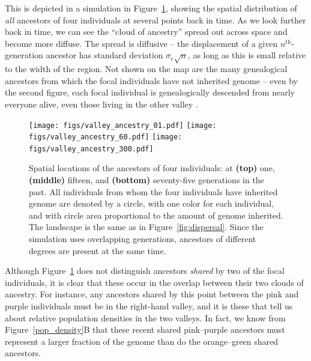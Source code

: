 \documentclass{ar-1col}
\newcommand{\g}[1]{{\color{blue}{#1}}}
\newcommand{\plr}[1]{{\color{green}{#1}}}
\newcommand{\todo}[1]{{\textbf{\color{red}{#1}}}}
\begin{document}
This is depicted in a simulation in Figure~\ref{ancestry_spread},
showing the spatial distribution of \emph{all} ancestors of four individuals
at several points back in time.
As we look further back in time,
we can see the ``cloud of ancestry'' spread out across space
and become more diffuse.
The spread is diffusive --
the displacement of a given $n^\text{th}$-generation ancestor 
has standard deviation $\sigma_e \sqrt{n}$,
as long as this is small relative to the width of the region.
Not shown on the map are the many genealogical ancestors
from which the focal individuals have not inherited genome --
even by the second figure,
each focal individual is genealogically descended from nearly everyone alive,
even those living in the other valley \citep{chang1999}.

\todo{tidy and conclude}

\begin{figure}[ht]
    \centering
        \texttt{[image: figs/valley\_ancestry\_01.pdf]}
        \texttt{[image: figs/valley\_ancestry\_60.pdf]}
        \texttt{[image: figs/valley\_ancestry\_300.pdf]}
        \caption{
            Spatial locations of the ancestors of four individuals:
            at 
            \textbf{(top)} one, 
            \textbf{(middle)} fifteen, and
            \textbf{(bottom)} seventy-five generations in the past.
            All individuals from whom the four individuals have inherited genome are denoted by a circle,
            with one color for each individual,
            and with circle area proportional to the amount of genome inherited.
            The landscape is the same as in Figure~\ref{fig:dispersal}.
            Since the simulation uses overlapping generations,
            ancestors of different degrees are present at the same time.
            \g{I say keep 1, 20, and 75.  If you go back farther, 
            	does it get even clearer that the pedigrees have ``forgotten" which side of the ridge the modern inds are on? 
                If so, that might make the point more clearly.}
            \plr{it does; I haven't run the simulation that long, though.}
        }
        \label{ancestry_spread}
\end{figure}

Although Figure~\ref{ancestry_spread} does not distinguish ancestors \emph{shared} by two of the focal individuals,
it is clear that these occur in the overlap between their two clouds of ancestry.
For instance, any ancestors shared by this point between the pink and purple individuals
must be in the right-hand valley,
and it is these that tell us about relative population densities in the two valleys.
In fact, we know from Figure~\ref{pop_density}B that these recent shared pink--purple ancestors
must represent a larger fraction of the genome
than do the orange--green shared ancestors.
\end{document}
